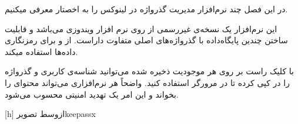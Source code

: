 
در این فصل چند نرم‌افزار مدیریت گذرواژه در لینوکس را به اخصتار معرفی میکنیم. 


این نرم‌افزار یک نسخه‌ی غیررسمی از روی نرم افزار ویندوزی  می‌باشد و قابلیت ساختن چندین پایگاه‌داده با گذرواژه‌های اصلی متفاوت داراست.  از  و  برای رمز‌نگاری داده‌ها استفاده میکند. 

با کلیک راست بر روی هر موجودیت ذخیره شده می‌توانید شناسه‌ی کاربری و گذرواژه را در  کپی کرده تا در مرورگر استفاده کنید. واضحاً هر نرم‌افزاری می‌تواند محتوای  را بخواند و این امر یک تهدید امنیتی محسوب می‌شود.

[h]
‌ازوسط
‌تصویر{keepassx}



